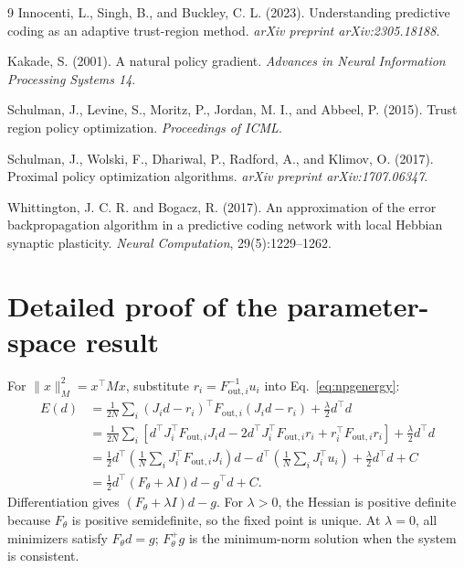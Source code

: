 \documentclass{article}
\newcommand{\Fouti}{F_{\mathrm{out},i}}
\newcommand{\Fpol}{F_{\theta}}
\begin{document}
\begin{thebibliography}{9}
Innocenti, L., Singh, B., and Buckley, C. L. (2023).
Understanding predictive coding as an adaptive trust-region method.
\emph{arXiv preprint arXiv:2305.18188}.

Kakade, S. (2001).
A natural policy gradient.
\emph{Advances in Neural Information Processing Systems 14}.

Schulman, J., Levine, S., Moritz, P., Jordan, M. I., and Abbeel, P. (2015).
Trust region policy optimization.
\emph{Proceedings of ICML}.

Schulman, J., Wolski, F., Dhariwal, P., Radford, A., and Klimov, O. (2017).
Proximal policy optimization algorithms.
\emph{arXiv preprint arXiv:1707.06347}.

Whittington, J. C. R. and Bogacz, R. (2017).
An approximation of the error backpropagation algorithm in a predictive coding network with local Hebbian synaptic plasticity.
\emph{Neural Computation}, 29(5):1229--1262.
\end{thebibliography}

\appendix
\section{Detailed proof of the parameter-space result}
\label{app:proof}

For $\|x\|_M^2=x^\top Mx$, substitute $r_i=\Fouti^{-1}u_i$ into Eq.~\eqref{eq:npgenergy}:
\begin{align}
E(d)
&=\frac{1}{2N}\sum_i
(J_id-r_i)^\top\Fouti(J_id-r_i)+\frac\lambda2d^\top d \\
&=\frac{1}{2N}\sum_i\left[
d^\top J_i^\top\Fouti J_id
-2d^\top J_i^\top\Fouti r_i
+r_i^\top\Fouti r_i\right]+\frac\lambda2d^\top d \\
&=\frac12d^\top\left(\frac1N\sum_iJ_i^\top\Fouti J_i\right)d
-d^\top\left(\frac1N\sum_iJ_i^\top u_i\right)
+\frac\lambda2d^\top d+C \\
&=\frac12d^\top(\Fpol+\lambda I)d-g^\top d+C.
\end{align}
Differentiation gives $(\Fpol+\lambda I)d-g$. For $\lambda>0$, the Hessian is positive definite because $\Fpol$ is positive semidefinite, so the fixed point is unique. At $\lambda=0$, all minimizers satisfy $\Fpol d=g$; $\Fpol^+g$ is the minimum-norm solution when the system is consistent.
\end{document}

